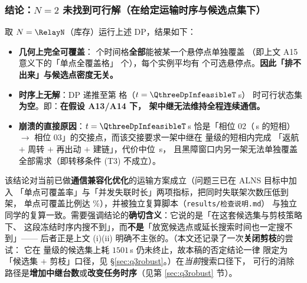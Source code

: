 \documentclass[12pt,a4paper,fontset=windows]{ctexart}
\begin{document}
\subsubsection{结论：$N=2$ 未找到可行解（在给定运输时序与候选点集下）}
取 $N=\RelayN$（库存）运行上述 DP，结果如下：

\begin{itemize}[leftmargin=2.2em,itemsep=2pt]
\item \textbf{几何上完全可覆盖}：\QthreeDpCells{} 个时间格\textbf{全部}能被某一个悬停点单独覆盖
（即上文 A15 意义下的「单点全覆盖格」\QthreeDpSingleCoverCells{} 个），每个实例平均有
\QthreeDpMeanPts{} 个可选悬停点。\textbf{因此「排不出来」与候选点密度无关。}
\item \textbf{时序上无解}：DP 递推至第 \QthreeDpInfeasibleCell{} 格（$t=\QthreeDpInfeasibleT$\,s）
时可行状态集\textbf{为空}。即：\textbf{在假设 A13/A14 下，\RelayN{} 架中继无法维持全程连续通信。}
\item \textbf{崩溃的直接原因}：$t=\QthreeDpInfeasibleT$\,s 恰是「相位 02（\QthreeDpShortPhaseMinS\,s 的短相）
$\to$ 相位 03」的交接点，而该交接要求一架中继在 \QthreeDpShortPhaseMinS{} 量级的短相内完成
「返航 $+$ 周转 $+$ 再出动 $+$ 建链」，代价中位 \QthreeDpBlackoutMedianS\,s，
且黑障窗口内另一架无法单独覆盖全部需求（即转移条件 (T3) 不成立）。
\end{itemize}

\begin{center}
\end{center}

该结论对当前已做\textbf{通信兼容化优化}的运输方案成立（问题三已在 ALNS 目标中加入
「单点可覆盖率」与「并发失联时长」两项指标，把同时失联架次数压低到 \QthreeDpPeakConcurrent{} 架，
单点可覆盖比例达 \QthreeCompromiseCoverRate\%），并被独立复算脚本（\texttt{results/检查说明.md}）
与独立同学的复算一致。需要强调结论的\textbf{确切含义}：它说的是「在这套候选集与剪枝策略下、
这段冻结时序内搜不到」，而\textbf{不是}「放宽候选点或延长搜索时间也一定搜不到」——
后者正是上文 (i)(ii) 明确不主张的。（本文还记录了一次\textbf{关闭剪枝}的尝试：
它在 \QthreeDpCandPts{} 量级的候选集上耗 $1501$\,s 仍未终止，故本稿的否定结论一律
限定为「候选集 $+$ 剪枝」口径，见 \S\ref{sec:q3robust}。）在\emph{当前}搜索口径下，
可行的消除路径是\textbf{增加中继台数}或\textbf{改变任务时序}（见第 \ref{sec:q3robust} 节）。
\end{document}
